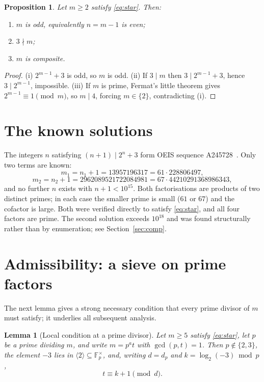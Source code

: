 \documentclass[11pt,reqno]{amsart}
\theoremstyle{plain}
\newtheorem{proposition}{Proposition}
\newtheorem{lemma}{Lemma}
\theoremstyle{definition}
\theoremstyle{remark}
\newcommand{\F}{\mathbb{F}}
\newcommand{\gen}[1]{\langle #1 \rangle}
\begin{document}
\begin{proposition}\label{prop:elem}
Let $m\ge 2$ satisfy \eqref{eq:star}. Then:
\begin{enumerate}[label=\textup{(\roman*)}]
\item $m$ is odd, equivalently $n=m-1$ is even;
\item $3\nmid m$;
\item $m$ is composite.
\end{enumerate}
\end{proposition}

\begin{proof}
(i) $2^{m-1}+3$ is odd, so $m$ is odd. (ii) If $3\mid m$ then $3\mid 2^{m-1}+3$, hence
$3\mid 2^{m-1}$, impossible. (iii) If $m$ is prime, Fermat's little theorem gives
$2^{m-1}\equiv 1\pmod m$, so $m\mid 4$, forcing $m\in\{2\}$, contradicting (i).
\end{proof}

\section{The known solutions}

The integers $n$ satisfying $(n+1)\mid 2^{n}+3$ form OEIS sequence A245728~\cite{oeis}. Only two
terms are known:
\[
m_{1}=n_{1}+1=13957196317=61\cdot 228806497,
\]
\[
m_{2}=n_{2}+1=2962089521722084981=67\cdot 44210291368986343,
\]
and no further $n$ exists with $n+1<10^{15}$. Both factorisations are products of two distinct
primes; in each case the smaller prime is small ($61$ or $67$) and the cofactor is large. Both
were verified directly to satisfy \eqref{eq:star}, and all four factors are prime. The second
solution exceeds $10^{18}$ and was found structurally rather than by enumeration; see
Section~\ref{sec:comp}.

\section{Admissibility: a sieve on prime factors}\label{sec:sieve}

The next lemma gives a strong necessary condition that every prime divisor of $m$ must satisfy;
it underlies all subsequent analysis.

\begin{lemma}[Local condition at a prime divisor]\label{lem:local}
Let $m\ge 5$ satisfy \eqref{eq:star}, let $p$ be a prime dividing $m$, and write $m=p^{a}t$ with
$\gcd(p,t)=1$. Then $p\notin\{2,3\}$, the element $-3$ lies in $\gen{2}\subseteq\F_{p}^{\times}$,
and, writing $d=d_{p}$ and $k=\log_{2}(-3)\bmod p$,
\begin{equation}\label{eq:loc}
t\equiv k+1\pmod{d}.
\end{equation}
\end{lemma}
\end{document}
